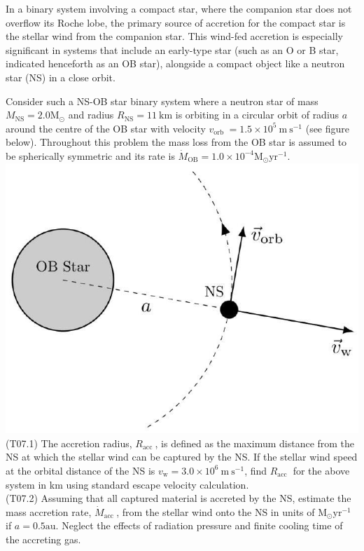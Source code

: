 \documentclass[10pt]{article}
\begin{document}
    In a binary system involving a compact star, where the companion star does not overflow its Roche lobe, the primary source of accretion for the compact star is the stellar wind from the companion star. This wind-fed accretion is especially significant in systems that include an early-type star (such as an O or B star, indicated henceforth as an OB star), alongside a compact object like a neutron star (NS) in a close orbit.

    Consider such a NS-OB star binary system where a neutron star of mass $M_{\mathrm{NS}}=2.0 \mathrm{M}_{\odot}$ and radius $R_{\mathrm{NS}}=11 \mathrm{~km}$ is orbiting in a circular orbit of radius $a$ around the centre of the OB star with velocity $v_{\text {orb }}=1.5 \times 10^{5} \mathrm{~m} \mathrm{~s}^{-1}$ (see figure below). Throughout this problem the mass loss from the OB star is assumed to be spherically symmetric and its rate is $\dot{M}_{\mathrm{OB}}=1.0 \times 10^{-4} \mathrm{M}_{\odot} \mathrm{yr}^{-1}$.\\
    \includegraphics[max width=\textwidth, center]{2025_08_23_e94579452776a99c4850g-06}\\
    (T07.1) The accretion radius, $R_{\text {acc }}$, is defined as the maximum distance from the NS at which the stellar wind can be captured by the NS. If the stellar wind speed at the orbital distance of the NS is $v_{\mathrm{w}}= 3.0 \times 10^{6} \mathrm{~m} \mathrm{~s}^{-1}$, find $R_{\text {acc }}$ for the above system in km using standard escape velocity calculation.\\
    (T07.2) Assuming that all captured material is accreted by the NS, estimate the mass accretion rate, $\dot{M}_{\text {acc }}$, from the stellar wind onto the NS in units of $\mathrm{M}_{\odot} \mathrm{yr}^{-1}$ if $a=0.5 \mathrm{au}$. Neglect the effects of radiation pressure and finite cooling time of the accreting gas.\\
\end{document}
